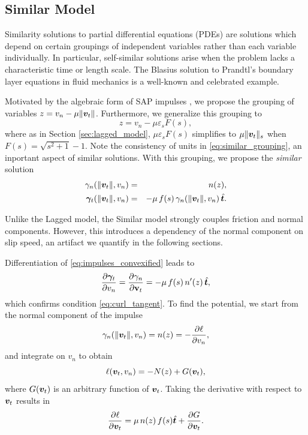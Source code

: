 \subsection{Similar Model}
\label{sec:similar_model}

Similarity solutions to partial differential equations (PDEs) are solutions which depend on certain groupings of
independent variables rather than each variable individually. In particular,
self-similar solutions arise when the problem lacks a characteristic time or
length scale. The Blasius solution to Prandtl's boundary layer equations in
fluid mechanics is a well-known and celebrated example.

 Motivated by the algebraic form of SAP impulses
\cite{bib:castro2022unconstrained}, we propose the grouping of variables $z =
v_n-\mu\Vert{\bm{v}}_t\Vert$. Furthermore, we generalize this grouping to
\begin{equation}
    z = v_n-\mu \varepsilon_sF(s),
    \label{eq:similar_grouping}
\end{equation}
where as in Section \ref{sec:lagged_model}, $\mu \varepsilon_sF(s)$ simplifies
to $\mu\Vert{\bm{v}}_t\Vert_s$ when $F(s)=\sqrt{s^2+1}-1$. Note the consistency of
units in \eqref{eq:similar_grouping}, an inportant aspect of similar solutions.
With this grouping, we propose the \emph{similar} solution
\begin{eqnarray}
    \gamma_n(\Vert\vf{v}_t\Vert,v_n) &=& n(z),\nonumber\\
    \bgamma_t(\Vert\vf{v}_t\Vert,v_n) &=&
    -\mu\,f(s)\,\gamma_n(\Vert\vf{v}_t\Vert,v_n)\,\hat{\vf{t}}.
    \label{eq:impulses_convexified}
\end{eqnarray}

Unlike the Lagged model, the Similar model strongly couples friction and normal
components. However, this introduces a dependency of the normal component on
slip speed, an artifact we quantify in the following sections.

Differentiation of \eqref{eq:impulses_convexified} leads to
\begin{eqnarray*}
    \frac{\partial{\bm\gamma}_t}{\partial
    v_n}=\frac{\partial\gamma_n}{\partial{\mathbf{v}}_t}=-\mu\,f(s)\,n'(z)\,\hat{{\bm{t}}},
\end{eqnarray*}
which confirms condition \eqref{eq:curl_tangent}. To find the potential, we
start from the normal component of the impulse
\begin{equation*}
    \gamma_n(\Vert{\bm{v}}_t\Vert,v_n) = n(z) = -\frac{\partial\ell}{\partial v_n},
\end{equation*}
and integrate on $v_n$ to obtain
\begin{equation*}
    \ell({\bm{v}}_t,v_n) = -N(z) + G({\bm{v}}_t),
\end{equation*}
where $G({\bm{v}}_t)$ is an arbitrary function of ${\bm{v}}_t$. Taking the
derivative with respect to ${\bm{v}}_t$ results in
\begin{equation*}
    \frac{\partial\ell}{\partial{\bm{v}}_t}=\mu\,n(z)\,f(s)\hat{{\bm{t}}} + \frac{\partial G}{\partial{\bm{v}}_t}.
\end{equation*}

